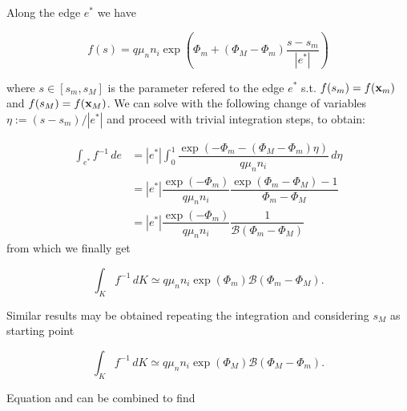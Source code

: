 

Along the edge $e^*$ we have

\begin{equation}
f(s) = q \mu_n n_i \exp\left( \Phi_m + (\Phi_M-\Phi_m)\dfrac{s-s_m}{|e^*|} \right)
\end{equation}

where $s \in [s_m,s_M]$ is the parameter refered to the edge $e^*$ s.t. $f(s_m)=f(\mathbf{x}_m)$ and $f(s_M)=f(\mathbf{x}_M)$. We can solve  with the following change of variables $\eta := (s-s_m)/|e^*|$ and proceed with trivial integration steps, to obtain:

\begin{align*}
\int_{e^*} f^{-1} \, de & = |e^*| \int_0^1 \dfrac{\exp \left(-\Phi_m - (\Phi_M-\Phi_m)\eta \right)}{q\mu_n n_i} 
 \, d\eta \\
  & = |e^*|\dfrac{\exp (-\Phi_m)}{q\mu_n n_i} \dfrac{\exp ( \Phi_m-\Phi_M)-1}{\Phi_m-\Phi_M} \\
 & =  |e^*|\dfrac{\exp (-\Phi_m)}{q\mu_n n_i} \dfrac{1}{\mathcal{B}(\Phi_m-\Phi_M)}
\end{align*}
from which we finally get

\begin{equation}
\label{eq: finally approzimation 3D to 1D}
\int_{K} f^{-1} \, dK \simeq  q \mu_n n_i \exp(\Phi_m) \mathcal{B}(\Phi_m-\Phi_M).
\end{equation}

Similar results may be obtained repeating the integration and considering $s_M$ as starting point

\begin{equation}
\label{eq: approssimazione sm}
\int_{K} f^{-1} \, dK \simeq  q \mu_n n_i \exp(\Phi_M) \mathcal{B}(\Phi_M-\Phi_m).
\end{equation}

Equation  and  can be combined to find

